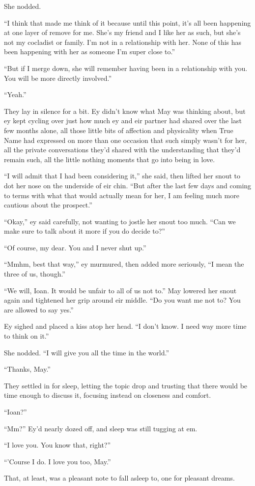 She nodded.

``I think that made me think of it because until this point, it's all been happening at one layer of remove for me. She's my friend and I like her as such, but she's not my cocladist or family. I'm not in a relationship with her. None of this has been happening with her as someone I'm super close to.''

``But if I merge down, she will remember having been in a relationship with you. You will be more directly involved.''

``Yeah.''

They lay in silence for a bit. Ey didn't know what May was thinking about, but ey kept cycling over just how much ey and eir partner had shared over the last few months alone, all those little bits of affection and physicality when True Name had expressed on more than one occasion that such simply wasn't for her, all the private conversations they'd shared with the understanding that they'd remain such, all the little nothing moments that go into being in love.

``I will admit that I had been considering it,'' she said, then lifted her snout to dot her nose on the underside of eir chin. ``But after the last few days and coming to terms with what that would actually mean for her, I am feeling much more cautious about the prospect.''

``Okay,'' ey said carefully, not wanting to jostle her snout too much. ``Can we make sure to talk about it more if you do decide to?''

``Of course, my dear. You and I never shut up.''

``Mmhm, best that way,'' ey murmured, then added more seriously, ``I mean the three of us, though.''

``We will, Ioan. It would be unfair to all of us not to.'' May lowered her snout again and tightened her grip around eir middle. ``Do you want me not to? You are allowed to say yes.''

Ey sighed and placed a kiss atop her head. ``I don't know. I need way more time to think on it.''

She nodded. ``I will give you all the time in the world.''

``Thanks, May.''

They settled in for sleep, letting the topic drop and trusting that there would be time enough to discuss it, focusing instead on closeness and comfort.

``Ioan?''

``Mm?'' Ey'd nearly dozed off, and sleep was still tugging at em.

``I love you. You know that, right?''

``'Course I do. I love you too, May.''

That, at least, was a pleasant note to fall asleep to, one for pleasant dreams.
